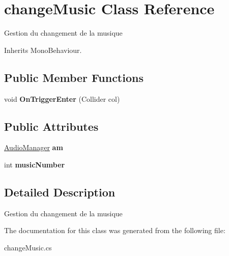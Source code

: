 \hypertarget{classchange_music}{\section{change\+Music Class Reference}
\label{classchange_music}
}


Gestion du changement de la musique  




Inherits Mono\+Behaviour.

\subsection*{Public Member Functions}
\begin{DoxyCompactItemize}
\item 
\hypertarget{classchange_music_a6536286f4f62e8dd9d4b1da895d8beb5}{void {\bfseries On\+Trigger\+Enter} (Collider col)}\label{classchange_music_a6536286f4f62e8dd9d4b1da895d8beb5}

\end{DoxyCompactItemize}
\subsection*{Public Attributes}
\begin{DoxyCompactItemize}
\item 
\hypertarget{classchange_music_ac5c991e1b45961491904a6b8d56a0f27}{\hyperlink{class_audio_manager}{Audio\+Manager} {\bfseries am}}\label{classchange_music_ac5c991e1b45961491904a6b8d56a0f27}

\item 
\hypertarget{classchange_music_a4bb5128e4b7fd8f68d6e6ed415c94372}{int {\bfseries music\+Number}}\label{classchange_music_a4bb5128e4b7fd8f68d6e6ed415c94372}

\end{DoxyCompactItemize}


\subsection{Detailed Description}
Gestion du changement de la musique 



The documentation for this class was generated from the following file\+:\begin{DoxyCompactItemize}
\item 
change\+Music.\+cs\end{DoxyCompactItemize}
